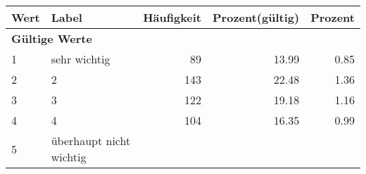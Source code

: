      \begin{longtable}{lXrrr}
     \toprule
     \textbf{Wert} & \textbf{Label} & \textbf{Häufigkeit} & \textbf{Prozent(gültig)} & \textbf{Prozent} \\
     \endhead
     \midrule
     \multicolumn{5}{l}{\textbf{Gültige Werte}}\\

     1 &
     \multicolumn{1}{X}{ sehr wichtig   } &


       \num{89} &
       \num[round-mode=places,round-precision=2]{13,99} &
         \num[round-mode=places,round-precision=2]{0,85} \\

     2 &
     \multicolumn{1}{X}{ 2   } &


       \num{143} &
       \num[round-mode=places,round-precision=2]{22,48} &
         \num[round-mode=places,round-precision=2]{1,36} \\

     3 &
     \multicolumn{1}{X}{ 3   } &


       \num{122} &
       \num[round-mode=places,round-precision=2]{19,18} &
         \num[round-mode=places,round-precision=2]{1,16} \\

     4 &
     \multicolumn{1}{X}{ 4   } &


       \num{104} &
       \num[round-mode=places,round-precision=2]{16,35} &
         \num[round-mode=places,round-precision=2]{0,99} \\

     5 &
     \multicolumn{1}{X}{ überhaupt nicht wichtig   } &



\end{longtable}
